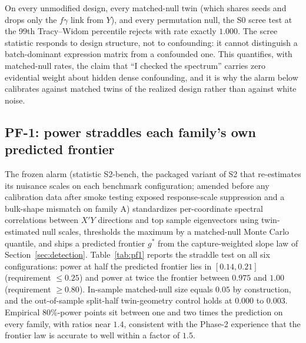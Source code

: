 On every unmodified design, every matched-null twin (which shares seeds and drops only the $f\gamma$ link from $Y$), and every permutation null, the S0 scree test at the 99th Tracy--Widom percentile rejects with rate exactly $1.000$. The scree statistic responds to design structure, not to confounding: it cannot distinguish a batch-dominant expression matrix from a confounded one. This quantifies, with matched-null rates, the claim that ``I checked the spectrum'' carries zero evidential weight about hidden dense confounding, and it is why the alarm below calibrates against matched twins of the realized design rather than against white noise.

\subsection*{PF-1: power straddles each family's own predicted frontier}

The frozen alarm (statistic S2-bench, the packaged variant of S2 that re-estimates its nuisance scales on each benchmark configuration; amended before any calibration data after smoke testing exposed response-scale suppression and a bulk-shape mismatch on family A) standardizes per-coordinate spectral correlations between $X'Y$ directions and top sample eigenvectors using twin-estimated null scales, thresholds the maximum by a matched-null Monte Carlo quantile, and ships a predicted frontier $g^*$ from the capture-weighted slope law of Section~\ref{sec:detection}. Table~\ref{tab:pf1} reports the straddle test on all six configurations: power at half the predicted frontier lies in $[0.14, 0.21]$ (requirement $\le 0.25$) and power at twice the frontier between $0.975$ and $1.00$ (requirement $\ge 0.80$). In-sample matched-null size equals $0.05$ by construction, and the out-of-sample split-half twin-geometry control holds at $0.000$ to $0.003$. Empirical 80\%-power points sit between one and two times the prediction on every family, with ratios near $1.4$, consistent with the Phase-2 experience that the frontier law is accurate to well within a factor of $1.5$.

